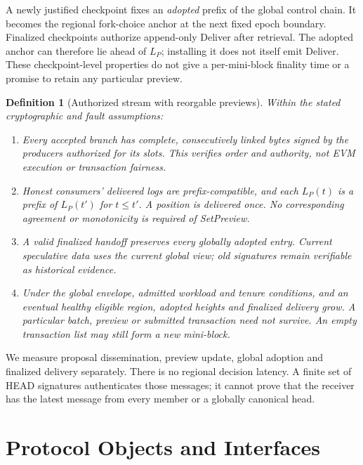 \documentclass[11pt,a4paper,onecolumn]{article}
\newtheorem{definition}{Definition}[section]
\theoremstyle{remark}\newtheorem{example}[definition]{Example}
\begin{document}
A newly justified checkpoint fixes an \emph{adopted} prefix of the global
control chain. It becomes the regional fork-choice anchor at the next fixed
epoch boundary. Finalized checkpoints authorize append-only Deliver after
retrieval. The adopted anchor can therefore lie ahead of $L_P$; installing it
does not itself emit Deliver. These checkpoint-level properties do not give a
per-mini-block finality time or a promise to retain any particular preview.

\begin{definition}[Authorized stream with reorgable previews]\label{def:service}
Within the stated cryptographic and fault assumptions:
\begin{enumerate}[label=\textnormal{(\roman*)}]
\item Every accepted branch has complete, consecutively linked bytes signed
by the producers authorized for its slots. This verifies order and authority,
not EVM execution or transaction fairness.
\item Honest consumers' delivered logs are prefix-compatible, and each
$L_P(t)$ is a prefix of $L_P(t')$ for $t\leq t'$. A position is delivered once.
No corresponding agreement or monotonicity is required of SetPreview.
\item A valid finalized handoff preserves every globally adopted entry.
Current speculative data uses the current global view; old signatures remain
verifiable as historical evidence.
\item Under the global envelope, admitted workload and tenure conditions,
and an eventual healthy eligible region, adopted heights and finalized
delivery grow. A particular batch, preview or submitted transaction need not
survive. An empty transaction list may still form a new mini-block.
\end{enumerate}
\end{definition}
We measure proposal dissemination, preview update, global adoption and finalized
delivery separately. There is no regional decision latency. A finite set of
HEAD signatures authenticates those messages; it cannot prove that the
receiver has the latest message from every member or a globally canonical head.

\section{Protocol Objects and Interfaces}\label{sec:objects}
\end{document}
